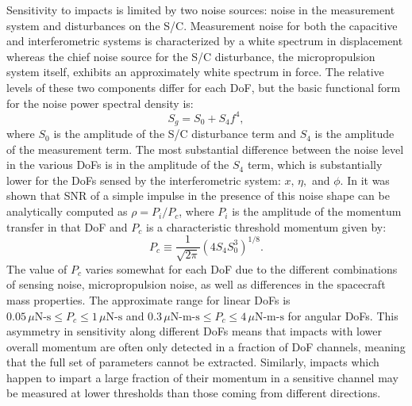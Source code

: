 \documentclass[twocolumn, trackchanges]{aastex61}
\begin{document}
Sensitivity to impacts is limited by two noise sources: noise in the measurement system and disturbances on the S/C.  Measurement noise for both the capacitive and interferometric systems is characterized by a white spectrum in displacement whereas the chief noise source for the S/C disturbance, the micropropulsion system itself, exhibits an approximately white spectrum in force.  The relative levels of these two components differ for each DoF, but the basic functional form for the noise power spectral density is:
\begin{equation}
S_{g}=S_0+S_4f^4,
\label{eq:noise}
\end{equation}
where $S_0$ is the amplitude of the S/C disturbance term and $S_4$ is the amplitude of the measurement term. The most substantial difference between the noise level in the various DoFs is in the amplitude of the $S_4$ term, which is substantially lower for the DoFs sensed by the interferometric system: $x,\,\eta,$ and $\phi$.  In \cite{Thorpe:2015cxa} it was shown that SNR of a simple impulse in the presence of this noise shape can be analytically computed as $\rho =  P_i/P_c$, where $P_i$ is the amplitude of the momentum transfer in that DoF and $P_c$ is a characteristic threshold momentum given by:
\begin{equation}
P_c \equiv \frac{1}{\sqrt{2\pi}}\left(4 S_4 S_0^3\right)^{1/8}.\label{eq:SNRp}
\end{equation} 
The value of $P_c$ varies somewhat for each DoF due to the different combinations of sensing noise, micropropulsion noise, as well as differences in the spacecraft mass properties. The approximate range for linear DoFs is $0.05\,\mu\textrm{N-s}\leq P_c \leq 1\,\mu\textrm{N-s}$ and $0.3\,\mu\textrm{N-m-s}\leq P_c \leq 4\,\mu\textrm{N-m-s}$ for angular DoFs. This asymmetry in sensitivity along different DoFs means that impacts with lower overall momentum are often only detected in a fraction of DoF channels, meaning that the full set of parameters cannot be extracted. Similarly, impacts which happen to impart a large fraction of their momentum in a sensitive channel may be measured at lower thresholds than those coming from different directions.

\FloatBarrier
\end{document}
